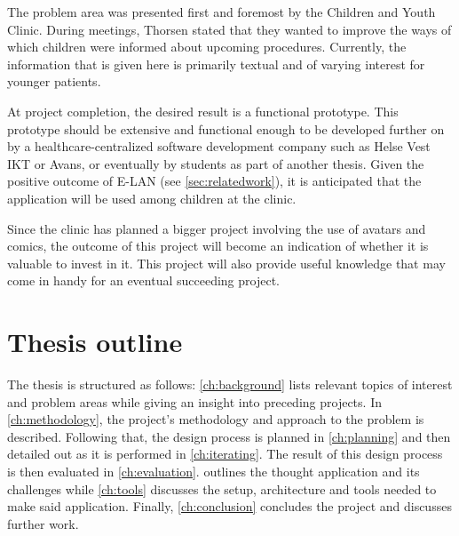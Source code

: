 The problem area was presented first and foremost by the Children and Youth Clinic. During meetings, Thorsen stated that they wanted to improve the ways of which children were informed about upcoming procedures. Currently, the information that is given here is primarily textual and of varying interest for younger patients.

At project completion, the desired result is a functional prototype. This prototype should be extensive and functional enough to be developed further on by a healthcare-centralized software development company such as Helse Vest IKT or Avans, or eventually by students as part of another thesis. Given the positive outcome of E-LAN (see \cref{sec:relatedwork}), it is anticipated that the application will be used among children at the clinic.


Since the clinic has planned a bigger project involving the use of avatars and comics, the outcome of this project will become an indication of whether it is valuable to invest in it. This project will also provide useful knowledge that may come in handy for an eventual succeeding project.

\section{Thesis outline}

The thesis is structured as follows: \cref{ch:background} lists relevant topics of interest and problem areas while giving an insight into preceding projects. In \cref{ch:methodology}, the project's methodology and approach to the problem is described. Following that, the design process is planned in \cref{ch:planning} and then detailed out as it is performed in \cref{ch:iterating}. The result of this design process is then evaluated in \cref{ch:evaluation}.  outlines the thought application and its challenges while \cref{ch:tools} discusses the setup, architecture and tools needed to make said application. Finally, \cref{ch:conclusion} concludes the project and discusses further work.
